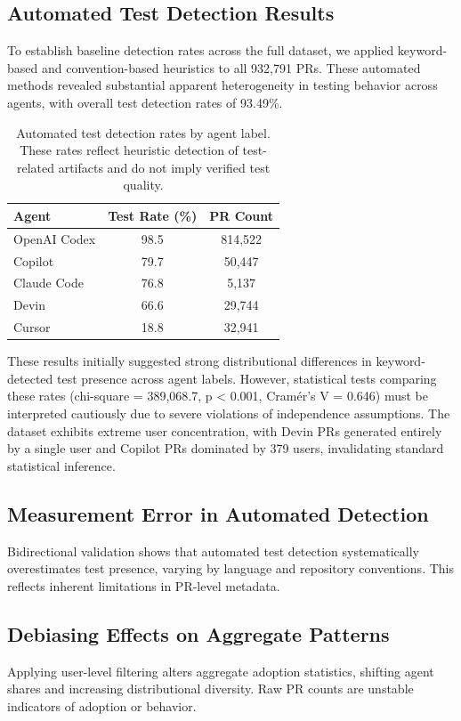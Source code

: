 \documentclass[conference]{IEEEtran}
\begin{document}
\subsection{Automated Test Detection Results}

To establish baseline detection rates across the full dataset, we applied keyword-based and convention-based heuristics to all 932,791 PRs. These automated methods revealed substantial apparent heterogeneity in testing behavior across agents, with overall test detection rates of 93.49\%.

\begin{table}[ht]
\centering
\caption{Automated test detection rates by agent label. These rates reflect heuristic detection of test-related artifacts and do not imply verified test quality.}
\begin{tabular}{lcc}
\toprule
Agent & Test Rate (\%) & PR Count \\
\midrule
OpenAI Codex & 98.5 & 814,522 \\
Copilot & 79.7 & 50,447 \\
Claude Code & 76.8 & 5,137 \\
Devin & 66.6 & 29,744 \\
Cursor & 18.8 & 32,941 \\
\bottomrule
\end{tabular}
\label{tab:automated_rates}
\end{table}

These results initially suggested strong distributional differences in keyword-detected test presence across agent labels. However, statistical tests comparing these rates (chi-square = 389,068.7, p < 0.001, Cramér's V = 0.646) must be interpreted cautiously due to severe violations of independence assumptions. The dataset exhibits extreme user concentration, with Devin PRs generated entirely by a single user and Copilot PRs dominated by 379 users, invalidating standard statistical inference.

\subsection{Measurement Error in Automated Detection}
Bidirectional validation shows that automated test detection systematically overestimates test presence, varying by language and repository conventions. This reflects inherent limitations in PR-level metadata.

\subsection{Debiasing Effects on Aggregate Patterns}
Applying user-level filtering alters aggregate adoption statistics, shifting agent shares and increasing distributional diversity. Raw PR counts are unstable indicators of adoption or behavior.
\end{document}
